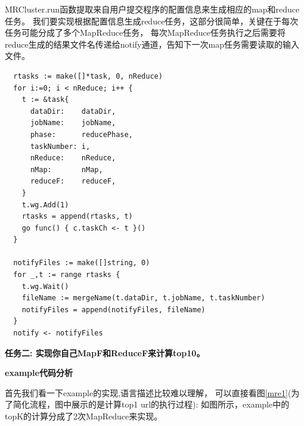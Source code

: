 \documentclass[UTF8]{ctexart}
\begin{document}
MRCluster.run函数提取来自用户提交程序的配置信息来生成相应的map和reduce任务。
我们要实现根据配置信息生成reduce任务，这部分很简单，关键在于每次任务可能分成了多个MapReduce任务，
每次MapReduce任务执行之后需要将reduce生成的结果文件名传递给notify通道，告知下一次map任务需要读取的输入文件。

\begin{lstlisting}
  rtasks := make([]*task, 0, nReduce)
  for i:=0; i < nReduce; i++ {
    t := &task{
      dataDir:    dataDir,
      jobName:    jobName,
      phase:      reducePhase,
      taskNumber: i,
      nReduce:    nReduce,
      nMap:       nMap,
      reduceF:    reduceF,
    }
    t.wg.Add(1)
    rtasks = append(rtasks, t)
    go func() { c.taskCh <- t }()
  }
  
  notifyFiles := make([]string, 0)
  for _,t := range rtasks {
    t.wg.Wait()
    fileName := mergeName(t.dataDir, t.jobName, t.taskNumber)
    notifyFiles = append(notifyFiles, fileName)
  }
  notify <- notifyFiles
\end{lstlisting}

\textbf{任务二: 实现你自己MapF和ReduceF来计算top10。}

\textbf{example代码分析}

首先我们看一下example的实现,语言描述比较难以理解，
可以直接看图\ref{mre1}(为了简化流程，图中展示的是计算top1 url的执行过程): 
如图所示，example中的topK的计算分成了2次MapReduce来实现。
\end{document}
